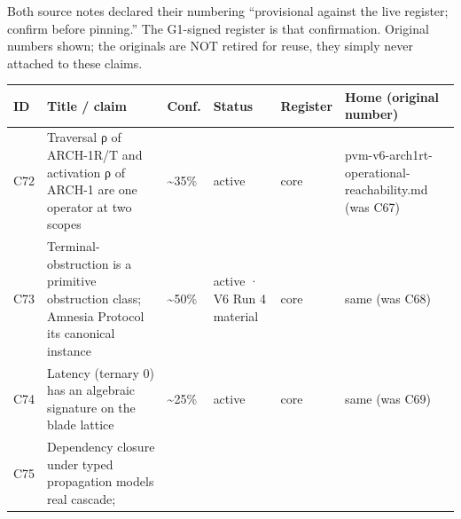 \documentclass[
]{article}
\newcounter{none} %
\begin{document}
Both source notes declared their numbering ``provisional against the
live register; confirm before pinning.'' The G1-signed register is that
confirmation. Original numbers shown; the originals are NOT retired for
reuse, they simply never attached to these claims.

{\def\LTcaptype{none} %
\begin{longtable}[]{@{}
  >{\raggedright\arraybackslash}p{}
  >{\raggedright\arraybackslash}p{}
  >{\raggedright\arraybackslash}p{}
  >{\raggedright\arraybackslash}p{}
  >{\raggedright\arraybackslash}p{}
  >{\raggedright\arraybackslash}p{}@{}}
\toprule\noalign{}
\begin{minipage}[b]{\linewidth}\raggedright
ID
\end{minipage} & \begin{minipage}[b]{\linewidth}\raggedright
Title / claim
\end{minipage} & \begin{minipage}[b]{\linewidth}\raggedright
Conf.
\end{minipage} & \begin{minipage}[b]{\linewidth}\raggedright
Status
\end{minipage} & \begin{minipage}[b]{\linewidth}\raggedright
Register
\end{minipage} & \begin{minipage}[b]{\linewidth}\raggedright
Home (original number)
\end{minipage} \\
\midrule\noalign{}
\endhead
\bottomrule\noalign{}
\endlastfoot
C72 & Traversal ρ of ARCH-1R/T and activation ρ of ARCH-1 are one
operator at two scopes & \textasciitilde35\% & active & core &
pvm-v6-arch1rt-operational-reachability.md (was C67) \\
C73 & Terminal-obstruction is a primitive obstruction class; Amnesia
Protocol its canonical instance & \textasciitilde50\% & active · V6 Run
4 material & core & same (was C68) \\
C74 & Latency (ternary 0) has an algebraic signature on the blade
lattice & \textasciitilde25\% & active & core & same (was C69) \\
C75 & Dependency closure under typed propagation models real cascade;

\end{longtable}}
\end{document}

